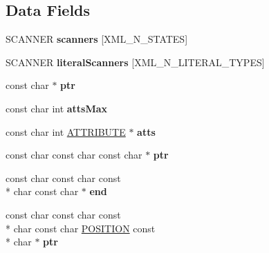 \subsection*{Data Fields}
\begin{DoxyCompactItemize}
\item 
\hypertarget{structencoding_af15c935d0343018b21e64a166532990e}{S\-C\-A\-N\-N\-E\-R {\bfseries scanners} \mbox{[}X\-M\-L\-\_\-\-N\-\_\-\-S\-T\-A\-T\-E\-S\mbox{]}}\label{structencoding_af15c935d0343018b21e64a166532990e}

\item 
\hypertarget{structencoding_a6ad3e1bba280862459c4762dbb10f9e0}{S\-C\-A\-N\-N\-E\-R {\bfseries literal\-Scanners} \mbox{[}X\-M\-L\-\_\-\-N\-\_\-\-L\-I\-T\-E\-R\-A\-L\-\_\-\-T\-Y\-P\-E\-S\mbox{]}}\label{structencoding_a6ad3e1bba280862459c4762dbb10f9e0}

\item 
\hypertarget{structencoding_ad338493153641b08ca2220ba0518bdb3}{const char $\ast$ {\bfseries ptr}}\label{structencoding_ad338493153641b08ca2220ba0518bdb3}

\item 
\hypertarget{structencoding_a7b42e4a6bc0c0969004a6644d01784f2}{const char int {\bfseries atts\-Max}}\label{structencoding_a7b42e4a6bc0c0969004a6644d01784f2}

\item 
\hypertarget{structencoding_a6f0f8a65c19c1b03bfe8b298bdb419ec}{const char int \hyperlink{struct_a_t_t_r_i_b_u_t_e}{A\-T\-T\-R\-I\-B\-U\-T\-E} $\ast$ {\bfseries atts}}\label{structencoding_a6f0f8a65c19c1b03bfe8b298bdb419ec}

\item 
\hypertarget{structencoding_aa4291770220296dccdae2caa59d3d10f}{const char const char const char $\ast$ {\bfseries ptr}}\label{structencoding_aa4291770220296dccdae2caa59d3d10f}

\item 
\hypertarget{structencoding_ac4aa42001aee7a5583395c922a0d50f5}{const char const char const \\*
char const char $\ast$ {\bfseries end}}\label{structencoding_ac4aa42001aee7a5583395c922a0d50f5}

\item 
\hypertarget{structencoding_ab8e153eed61327bf8fa793f53ee59e0f}{const char const char const \\*
char const char \hyperlink{structposition}{P\-O\-S\-I\-T\-I\-O\-N} const \\*
char $\ast$ {\bfseries ptr}}\label{structencoding_ab8e153eed61327bf8fa793f53ee59e0f}


\end{DoxyCompactItemize}
